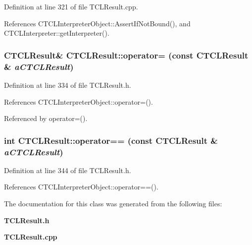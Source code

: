 Definition at line 321 of file TCLResult.cpp.

References CTCLInterpreter\-Object::Assert\-If\-Not\-Bound(), and CTCLInterpreter::get\-Interpreter().
\subsubsection{\setlength{\rightskip}{0pt plus 5cm}CTCLResult\& CTCLResult::operator= (const CTCLResult \& {\em a\-CTCLResult})\hspace{0.3cm}{\tt  [inline]}}\label{classCTCLResult_a4}




Definition at line 334 of file TCLResult.h.

References CTCLInterpreter\-Object::operator=().

Referenced by operator=().
\subsubsection{\setlength{\rightskip}{0pt plus 5cm}int CTCLResult::operator== (const CTCLResult \& {\em a\-CTCLResult})\hspace{0.3cm}{\tt  [inline]}}\label{classCTCLResult_a5}




Definition at line 344 of file TCLResult.h.

References CTCLInterpreter\-Object::operator==().

The documentation for this class was generated from the following files:\begin{CompactItemize}
\item 
{\bf TCLResult.h}\item 
{\bf TCLResult.cpp}\end{CompactItemize}
